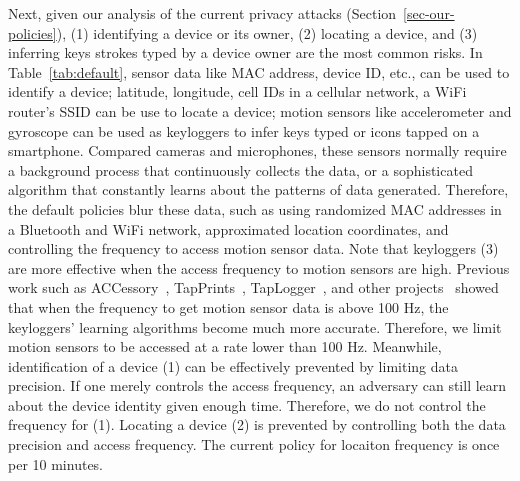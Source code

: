 Next, given our analysis of the current privacy attacks 
(Section~\ref{sec-our-policies}), (1) identifying a device or its owner, (2) locating 
a device, and (3) inferring keys strokes typed by a device owner are the most
common risks. In Table~\ref{tab:default}, sensor data like MAC address, 
device ID, etc., can be used to identify a device; latitude, longitude, cell 
IDs in a cellular network, a WiFi router's SSID can be use to locate a 
device; motion sensors like accelerometer and gyroscope can be used
as keyloggers to infer keys typed or icons tapped on a 
smartphone. Compared cameras and microphones, these 
sensors normally require a background process that continuously 
collects the data, or a sophisticated algorithm that constantly learns 
about the patterns of data generated. Therefore, the default policies 
blur these data, such as using randomized MAC addresses in a 
Bluetooth and WiFi network, approximated location coordinates, and 
controlling the frequency to access motion sensor data. Note that keyloggers (3)
are more effective when the access frequency to motion sensors are 
high. Previous work such as ACCessory~\cite{owusu2012accessory}, 
TapPrints~\cite{miluzzo2012tapprints}, TapLogger~\cite{xu2012taplogger}, 
and other projects~\cite{aviv2012practicality} showed that when the 
frequency to get motion sensor data is above 100 Hz, the keyloggers' 
learning algorithms become much more accurate. Therefore, we limit 
motion sensors to be accessed at a rate lower than 100 Hz. Meanwhile, 
identification of a device (1) can be effectively prevented by limiting data 
precision. If one merely controls the access frequency, an adversary can 
still learn about the device identity given enough time. Therefore, we do
not control the frequency for (1). Locating a device (2) is prevented by 
controlling both the data precision and access frequency. The current policy
for locaiton frequency is once per 10 minutes. 

